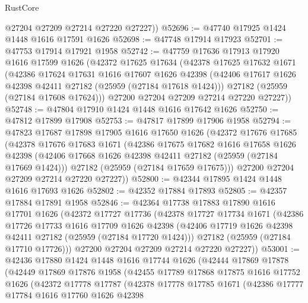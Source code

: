 \begin{lexlean}{RustCore}
\begin{coremodule}
        @27204
        @27209
        @27214
        @27220
        @27227))
@52696 := @47740 @17925 @1424 @1448 @1616 @17591 @1626
@52698 := @47748 @17914 @17923
@52701 := @47753 @17914 @17921 @1958
@52742 := @47759
    @17636
    @17913
    @17920
    @1616
    @17599
    @1626
    (@42372
      @17625
      @17634
      (@42378
        @17625
        @17632
        @1671
        (@42386
          @17624
          @17631
          @1616
          @17607
          @1626
          @42398
          (@42406 @17617 @1626 @42398 @42411 @27182 (@25959 (@27184 @17618 @1424)))
          @27182
          (@25959 (@27184 @17608 @17624)))
        @27200
        @27204
        @27209
        @27214
        @27220
        @27227))
@52748 := @47804 @17910 @1424 @1448 @1616 @17642 @1626
@52750 := @47812 @17899 @17908
@52753 := @47817 @17899 @17906 @1958
@52794 := @47823
    @17687
    @17898
    @17905
    @1616
    @17650
    @1626
    (@42372
      @17676
      @17685
      (@42378
        @17676
        @17683
        @1671
        (@42386
          @17675
          @17682
          @1616
          @17658
          @1626
          @42398
          (@42406 @17668 @1626 @42398 @42411 @27182 (@25959 (@27184 @17669 @1424)))
          @27182
          (@25959 (@27184 @17659 @17675)))
        @27200
        @27204
        @27209
        @27214
        @27220
        @27227))
@52800 := @42344 @17895 @1424 @1448 @1616 @17693 @1626
@52802 := @42352 @17884 @17893
@52805 := @42357 @17884 @17891 @1958
@52846 := @42364
    @17738
    @17883
    @17890
    @1616
    @17701
    @1626
    (@42372
      @17727
      @17736
      (@42378
        @17727
        @17734
        @1671
        (@42386
          @17726
          @17733
          @1616
          @17709
          @1626
          @42398
          (@42406 @17719 @1626 @42398 @42411 @27182 (@25959 (@27184 @17720 @1424)))
          @27182
          (@25959 (@27184 @17710 @17726)))
        @27200
        @27204
        @27209
        @27214
        @27220
        @27227))
@53001 := @42436
    @17880
    @1424
    @1448
    @1616
    @17744
    @1626
    (@42444
      @17869
      @17878
      (@42449
        @17869
        @17876
        @1958
        (@42455
          @17789
          @17868
          @17875
          @1616
          @17752
          @1626
          (@42372
            @17778
            @17787
            (@42378
              @17778
              @17785
              @1671
              (@42386
                @17777
                @17784
                @1616
                @17760
                @1626
                @42398

\end{coremodule}
\end{lexlean}
